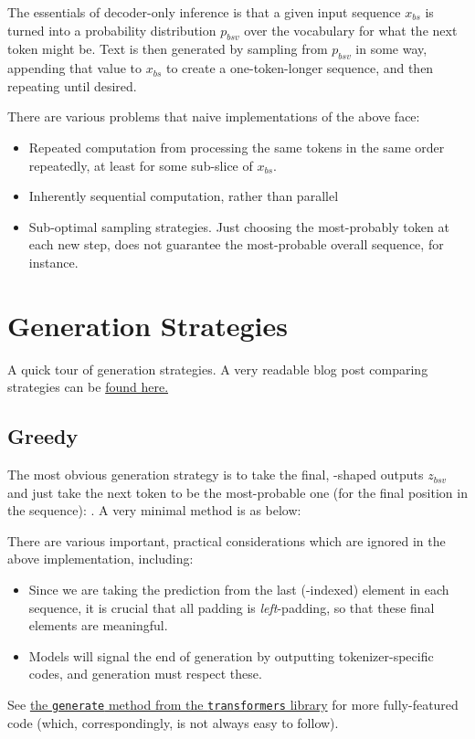 \documentclass[11pt]{article}
\begin{document}
The essentials of decoder-only inference is that a given input sequence $ x _{ bs } $ is turned into
a probability distribution $ p _{ bsv } $ over the vocabulary for what the next token might be.  Text
is then generated by sampling from $ p _{ bsv } $ in some way, appending that value to $ x _{ bs } $
to create a one-token-longer sequence, and then repeating until desired.

There are various problems that naive implementations of the above face:
\begin{itemize}
	\item Repeated computation from processing the same tokens in the same order repeatedly, at least for
	      some sub-slice of $ x _{ bs } $.
	\item Inherently sequential computation, rather than parallel
	\item Sub-optimal sampling strategies. Just choosing the most-probably token at each new step, does
	      not guarantee the most-probable overall sequence, for instance.
\end{itemize}



\section{Generation Strategies \label{sec_generation_strats} }

A quick tour of generation strategies. A very readable blog post comparing strategies can be
\href{https://huggingface.co/blog/how-to-generate}{found here.}


\subsection{Greedy \label{subsec_greedy_gen}}

The most obvious generation strategy is to take the final, -shaped outputs $ z
		_{ bsv } $ and just take the next token to be the most-probable one (for the final position in the
sequence): . A very minimal  method
is as below:

There are various important, practical considerations which are ignored in the above implementation, including:
\begin{itemize}
	\item Since we are taking the prediction from the last (-indexed) element in each
	      sequence, it is crucial that all padding is \textit{left}-padding, so that these final
	      elements are meaningful.
	\item Models will signal the end of generation by outputting tokenizer-specific codes, and
	      generation must respect these.
\end{itemize}
See
\href{https://github.com/huggingface/transformers/blob/04ab5605fbb4ef207b10bf2772d88c53fc242e83/src/transformers/generation/utils.py#L1115}{the
	\texttt{generate} method from the \texttt{transformers} library} for more fully-featured code
(which, correspondingly, is not always easy to follow).
\end{document}
